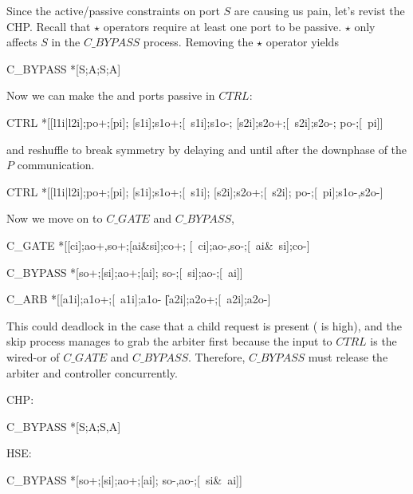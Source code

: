 \documentclass[aer.tex]{subfiles}
\begin{document}
Since the active/passive constraints on port $S$ are causing us pain, let's revist the CHP.
Recall that $\star$ operators require at least one port to be passive. 
$\star$ only affects $S$ in the $C\_BY\!P\!ASS$ process. Removing the $\star$ operator yields

\begin{csp}
C_BYPASS\equiv
  *[S;A;S;A]
\end{csp}

\noindent Now we can make the  and  ports passive in $CTRL$:

\begin{hse}
CTRL\equiv
  *[[l1i|l2i];po+;[pi];
    [s1i];s1o+;[~s1i];s1o-;
    [s2i];s2o+;[~s2i];s2o-;
    po-;[~pi]]
\end{hse}

\noindent and reshuffle to break symmetry by delaying
 and  until after the
downphase of the $P$ communication.

\begin{hse}
CTRL\equiv
  *[[l1i|l2i];po+;[pi];
    [s1i];s1o+;[~s1i];
    [s2i];s2o+;[~s2i];
    po-;[~pi];s1o-,s2o-]
\end{hse}

\noindent Now we move on to $C\_GATE$ and $C\_BY\!P\!ASS$,

\begin{hse}
C_GATE\equiv    
  *[[ci];ao+,so+;[ai&si];co+;
    [~ci];ao-,so-;[~ai&~si];co-]

C_BYPASS\equiv
  *[so+;[si];ao+;[ai];
    so-;[~si];ao-;[~ai]]

C_ARB\equiv
  *[[a1i];a1o+;[~a1i];a1o-
   \|[a2i];a2o+;[~a2i];a2o-]
\end{hse}

\noindent This could deadlock in the case that a child request is present ( is high),
and the skip process manages to grab the arbiter first because the  input to $CTRL$ 
is the wired-or of $C\_GATE$ and $C\_BYPASS$. 
Therefore, $C\_BYPASS$ must release the arbiter and controller concurrently.

\noindent CHP:

\begin{csp}
C_BYPASS\equiv
  *[S;A;S,A]
\end{csp}

\noindent HSE:

\begin{hse}
C_BYPASS\equiv
  *[so+;[si];ao+;[ai];
    so-,ao-;[~si&~ai]]
\end{hse}
\end{document}
